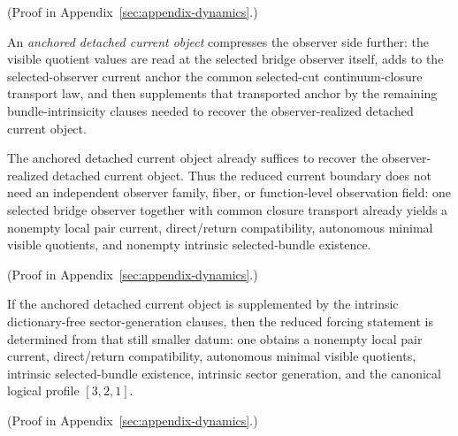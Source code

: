 (Proof in Appendix~\ref{sec:appendix-dynamics}.)

\begin{definition}
\label{def:anchored-detached-current-object}
An \emph{anchored detached current object} compresses the observer side further:
the visible quotient values are read at the selected bridge observer itself,
adds to the selected-observer current anchor the common selected-cut
continuum-closure transport law, and then supplements that transported
anchor by the remaining bundle-intrinsicity clauses needed to recover the
observer-realized detached current object.
\end{definition}

\begin{theorem}
\label{thm:anchored-detached-current-object-recovers-the-observer-realized-surface}
The anchored detached current object already suffices to recover the
observer-realized detached current object. Thus the reduced current boundary
does
not need an independent observer family, fiber, or function-level observation
field: one selected bridge observer together with common closure transport
already yields a nonempty local pair current, direct/return compatibility,
autonomous minimal visible quotients, and nonempty intrinsic selected-bundle
existence.
\end{theorem}

(Proof in Appendix~\ref{sec:appendix-dynamics}.)

\begin{corollary}
\label{cor:anchored-detached-current-sector-object-closes-the-reduced-seam}
If the anchored detached current object is supplemented by the intrinsic
dictionary-free sector-generation clauses, then the reduced forcing statement is
determined from that still smaller datum: one obtains a nonempty local pair
current, direct/return compatibility, autonomous minimal visible quotients,
intrinsic selected-bundle existence, intrinsic sector generation, and the
canonical logical profile \([3,2,1]\).
\end{corollary}

(Proof in Appendix~\ref{sec:appendix-dynamics}.)

